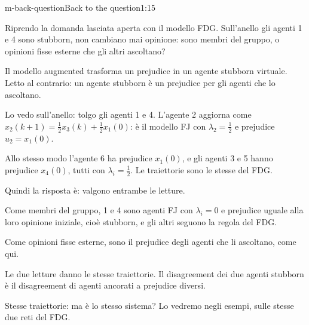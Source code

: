 \begin{slidedue}{m-back-question}{Back to the question\spostata}{1:15}
  \begin{discorso}
    \item Riprendo la domanda lasciata aperta con il modello FDG. Sull'anello gli agenti 1 e 4 sono stubborn, non cambiano mai opinione: sono membri del gruppo, o opinioni fisse esterne che gli altri ascoltano?
    \item Il modello augmented {\color{red}  } {\color{blue}trasforma} un prejudice in un agente stubborn virtuale. Letto al contrario: un agente stubborn è un prejudice per gli agenti che lo ascoltano.
    \item Lo vedo sull'anello: tolgo gli agenti 1 e 4. L'agente 2 aggiorna come $x_2(k+1)=\tfrac12x_3(k)+\tfrac12x_1(0)$: è il modello FJ con $\lambda_2=\tfrac12$ e prejudice $u_2=x_1(0)$.
    \item Allo stesso modo l'agente 6 ha prejudice $x_1(0)$, e gli agenti 3 e 5 hanno prejudice $x_4(0)$, tutti con $\lambda_i=\tfrac12$. Le traiettorie sono le stesse del FDG.
    \item \clic Quindi la risposta è: valgono entrambe le letture.
    \item Come membri del gruppo, 1 e 4 sono agenti FJ con $\lambda_i=0$ e prejudice uguale alla loro opinione iniziale, cioè stubborn, e gli altri seguono la regola del FDG.
    \item Come opinioni fisse esterne, sono il prejudice degli agenti che li ascoltano, come qui.
    \item Le due letture danno le stesse traiettorie. Il disagreement dei due agenti stubborn è il disagreement di agenti ancorati a prejudice diversi.
    \item Stesse traiettorie: ma è lo stesso sistema? Lo vedremo negli {\color{red}        } {\color{blue}esempi, sulle stesse due reti del FDG.}
  \end{discorso}
\end{slidedue}


